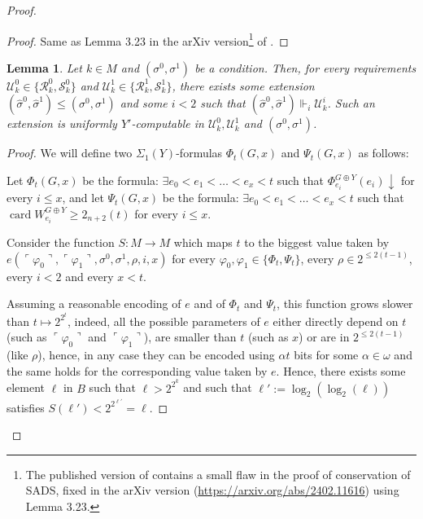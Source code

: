 \documentclass{article}
\def\U{\mathcal{U}}
\def\R{\mathcal{R}}
\def\S{\mathcal{S}}
\newcommand{\card}{\operatorname{card}}
\numberwithin{theorem}{section}
\newtheorem{lemma}[theorem]{Lemma}
\begin{document}
\begin{proof}
\begin{proof}
    Same as Lemma 3.23 in the arXiv version\footnote{The published version of \cite{houerou2025conservation} contains a small flaw in the proof of conservation of SADS, fixed in the arXiv version (\url{https://arxiv.org/abs/2402.11616}) using Lemma 3.23.} of \cite{houerou2025conservation}.
\end{proof}

\begin{lemma}\label{lem:sads-forcing-eff-jump}
Let $k \in M$ and $(\sigma^0, \sigma^1)$ be a condition. Then, for every requirements $\mathcal{U}^0_k \in \{\R^0_k, \S^0_k\}$ and $\mathcal{U}^1_k \in \{\R^1_k, \S^1_k\}$, there exists some extension $(\hat \sigma^0, \hat \sigma^1) \leq (\sigma^0, \sigma^1)$ and some $i < 2$ such that $(\hat \sigma^0, \hat \sigma^1) \Vdash_i \mathcal{U}^i_k$. Such an extension is uniformly $Y'$-computable in $\U_k^0, \U_k^1$ and $(\sigma^0, \sigma^1)$.
\end{lemma}

\begin{proof}

We will define two $\Sigma_1(Y)$-formulas $\Phi_t(G,x)$ and $\Psi_t(G,x)$ as follows:


Let $\Phi_{t}(G,x)$ be the formula: $\exists e_0 < e_1 < \dots < e_{x} < t$ such that $\Phi_{e_i}^{G \oplus Y}(e_i) \downarrow$ for every $i \leq x$, and let $\Psi_t(G,x)$ be the formula: $\exists e_0 < e_1 < \dots < e_{x} < t$ such that $\card W_{e_i}^{G \oplus Y} \geq 2_{n+2}(t)$ for every $i \leq x$.


Consider the function $S : M \to M$ which maps $t$ to the biggest value taken by $e(\ulcorner\varphi_0 \urcorner, \ulcorner \varphi_1 \urcorner, \sigma^0, \sigma^1, \rho, i, x)$ for every $\varphi_0, \varphi_1 \in \{\Phi_t, \Psi_t \}$, every $\rho \in 2^{\leq 2(t-1)}$, every $i < 2$ and every $x < t$. 

Assuming a reasonable encoding of $e$ and of $\Phi_t$ and $\Psi_t$, this function grows slower than $t \mapsto 2^{2^t}$, indeed, all the possible parameters of $e$ either directly depend on $t$ (such as $\ulcorner\varphi_0 \urcorner$ and $\ulcorner \varphi_1 \urcorner$), are smaller than $t$ (such as $x$) or are in $2^{\leq2(t-1)}$ (like $\rho$), hence, in any case they can be encoded using $\alpha t$ bits for some $\alpha \in \omega$ and the same holds for the corresponding value taken by $e$. Hence, there exists some element $\ell$ in $B$ such that $\ell>2^{2^{k}}$ and such that $\ell' := \log_2(\log_2(\ell))$ satisfies $S(\ell') < 2^{2^{\ell'}} = \ell$.


\end{proof}
\end{proof}
\end{document}
